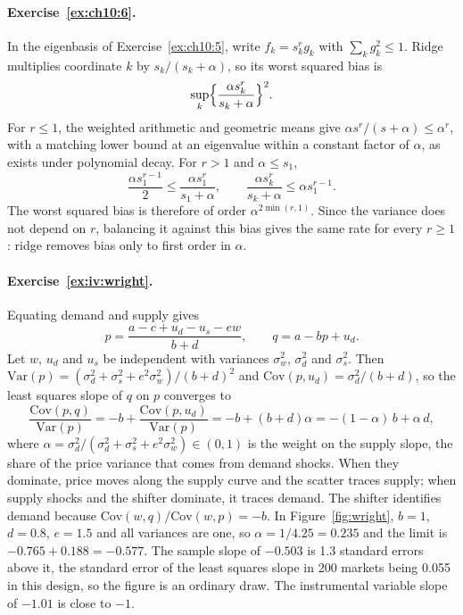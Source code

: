 \paragraph{Exercise~\ref{ex:ch10:6}.} In the eigenbasis of Exercise~\ref{ex:ch10:5}, write $f_k = s_k^r g_k$ with $\sum_k g_k^2 \le 1$. Ridge multiplies coordinate $k$ by $s_k/(s_k + \alpha)$, so its worst squared bias is
\[
\sup_k\Bigl\{\frac{\alpha s_k^r}{s_k + \alpha}\Bigr\}^2.
\]
For $r \le 1$, the weighted arithmetic and geometric means give $\alpha s^r/(s + \alpha) \le \alpha^r$, with a matching lower bound at an eigenvalue within a constant factor of $\alpha$, as exists under polynomial decay. For $r > 1$ and $\alpha \le s_1$,
\[
\frac{\alpha s_1^{r-1}}2 \le \frac{\alpha s_1^r}{s_1 + \alpha},
\qquad
\frac{\alpha s_k^r}{s_k + \alpha} \le \alpha s_1^{r-1}.
\]
The worst squared bias is therefore of order $\alpha^{2\min(r,1)}$. Since the variance does not depend on $r$, balancing it against this bias gives the same rate for every $r \ge 1$: ridge removes bias only to first order in $\alpha$.

\paragraph{Exercise~\ref{ex:iv:wright}.} Equating demand and supply gives
\[
p = \frac{a - c + u_d - u_s - ew}{b + d}, \qquad q = a - bp + u_d.
\]
Let $w$, $u_d$ and $u_s$ be independent with variances $\sigma_w^2$, $\sigma_d^2$ and $\sigma_s^2$. Then $\mathrm{Var}(p) = (\sigma_d^2 + \sigma_s^2 + e^2\sigma_w^2)/(b + d)^2$ and $\mathrm{Cov}(p, u_d) = \sigma_d^2/(b + d)$, so the least squares slope of $q$ on $p$ converges to
\[
\frac{\mathrm{Cov}(p, q)}{\mathrm{Var}(p)} = -b + \frac{\mathrm{Cov}(p, u_d)}{\mathrm{Var}(p)} = -b + (b + d)\alpha = -(1 - \alpha)\,b + \alpha\,d,
\]
where $\alpha = \sigma_d^2/(\sigma_d^2 + \sigma_s^2 + e^2\sigma_w^2) \in (0, 1)$ is the weight on the supply slope, the share of the price variance that comes from demand shocks. When they dominate, price moves along the supply curve and the scatter traces supply; when supply shocks and the shifter dominate, it traces demand. The shifter identifies demand because $\mathrm{Cov}(w, q)/\mathrm{Cov}(w, p) = -b$. In Figure~\ref{fig:wright}, $b = 1$, $d = 0.8$, $e = 1.5$ and all variances are one, so $\alpha = 1/4.25 = 0.235$ and the limit is $-0.765 + 0.188 = -0.577$. The sample slope of $-0.503$ is 1.3 standard errors above it, the standard error of the least squares slope in 200 markets being 0.055 in this design, so the figure is an ordinary draw. The instrumental variable slope of $-1.01$ is close to $-1$.

